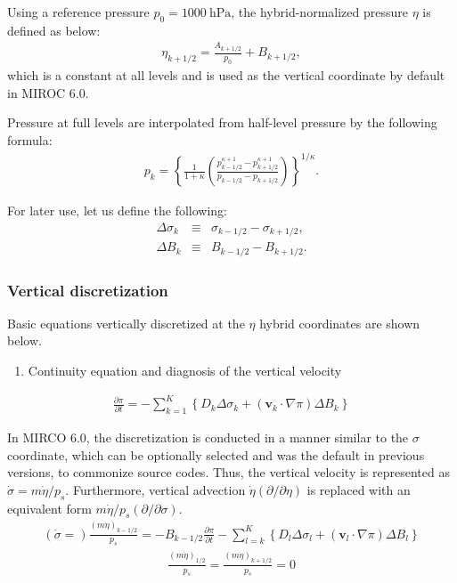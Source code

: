 Using a reference pressure \(p_0=1000\ \mathrm{hPa}\), the hybrid-normalized pressure \(\eta\) is defined as below:
\begin{eqnarray}
\eta_{k+1/2} = \frac{A_{k+1/2}}{p_0} +B_{k+1/2},
\end{eqnarray}
which is a constant at all levels and is used as the vertical coordinate by default in MIROC 6.0.

Pressure at full levels are interpolated from half-level pressure by the following formula:
\begin{eqnarray}
 p_k = \left\{ \frac{1}{1+\kappa}
                     \left( \frac{  p^{\kappa +1}_{k-1/2}
                                  - p^{\kappa +1}_{k+1/2}      }
                                  { p_{k-1/2} - p_{k+1/2} }
                     \right)
              \right\}^{1/\kappa}.
\end{eqnarray}

For later use, let us define the following:
\begin{eqnarray}
  \Delta\sigma_k &\equiv & \sigma_{k-1/2} - \sigma_{k+1/2}, \\
  \Delta B_k &\equiv & B_{k-1/2} - B_{k+1/2}.
\end{eqnarray}

\hypertarget{vertical-discretization-1}{%
\subsubsection{Vertical
discretization}\label{vertical-discretization-1}}

Basic equations vertically discretized at the $\eta$ hybrid coordinates are shown below.

\begin{enumerate}
\def\labelenumi{\arabic{enumi}.}
\tightlist
\item
  Continuity equation and diagnosis of the vertical velocity
\end{enumerate}
\begin{eqnarray}
  \frac{\partial \pi}{\partial t}
 = - \sum_{k=1}^{K} \left\{ D_k \Delta\sigma_k + ({\mathbf{v}}_k \cdot \nabla \pi)\Delta B_k \right\}
\end{eqnarray}

In MIRCO 6.0, the discretization is conducted in a manner similar to the $\sigma$ coordinate,
which can be optionally selected and was the default in previous versions, to commonize source codes.
Thus, the vertical velocity is represented as \(\dot{\sigma}=m\dot{\eta}/p_s\).
Furthermore, vertical advection \(\dot{\eta}(\partial/\partial\eta)\) is replaced with an equivalent form \(m\dot{\eta}/p_s(\partial/\partial\sigma)\).
\begin{eqnarray}
  \left(\dot{\sigma}=\right)\frac{(m\dot{\eta})_{k-1/2}}{p_s}
 = - B_{k-1/2} \frac{\partial \pi}{\partial t}
   - \sum_{l=k}^{K}\left\{ D_l \Delta\sigma_l + ({\mathbf{v}}_l \cdot \nabla \pi)\Delta B_l \right\}
\end{eqnarray}
\begin{eqnarray}
  \frac{(m\dot{\eta})_{1/2}}{p_s} = \frac{(m\dot{\eta})_{k+1/2}}{p_s} = 0
\end{eqnarray}

